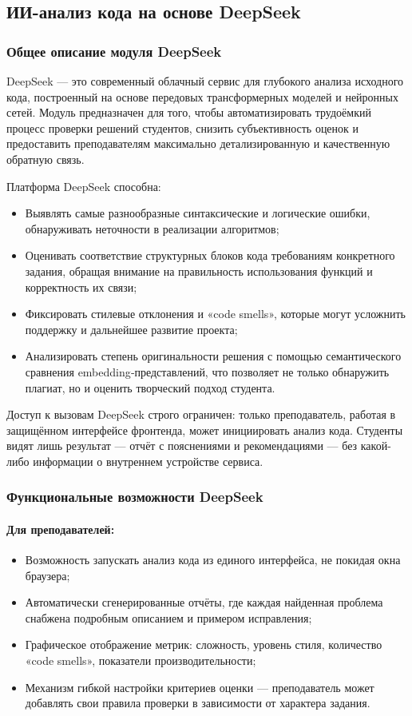 \subsection{ИИ-анализ кода на основе DeepSeek}

\subsubsection{Общее описание модуля DeepSeek}
DeepSeek — это современный облачный сервис для глубокого анализа исходного кода, построенный на основе передовых трансформерных моделей и нейронных сетей. Модуль предназначен для того, чтобы автоматизировать трудоёмкий процесс проверки решений студентов, снизить субъективность оценок и предоставить преподавателям максимально детализированную и качественную обратную связь.

Платформа DeepSeek способна:
\begin{itemize}
  \item Выявлять самые разнообразные синтаксические и логические ошибки, обнаруживать неточности в реализации алгоритмов;
  \item Оценивать соответствие структурных блоков кода требованиям конкретного задания, обращая внимание на правильность использования функций и корректность их связи;
  \item Фиксировать стилевые отклонения и «code smells», которые могут усложнить поддержку и дальнейшее развитие проекта;
  \item Анализировать степень оригинальности решения с помощью семантического сравнения embedding‐представлений, что позволяет не только обнаружить плагиат, но и оценить творческий подход студента.
\end{itemize}

Доступ к вызовам DeepSeek строго ограничен: только преподаватель, работая в защищённом интерфейсе фронтенда, может инициировать анализ кода. Студенты видят лишь результат — отчёт с пояснениями и рекомендациями — без какой-либо информации о внутреннем устройстве сервиса.

\subsubsection{Функциональные возможности DeepSeek}

\paragraph{Для преподавателей:}
\begin{itemize}
  \item Возможность запускать анализ кода из единого интерфейса, не покидая окна браузера;
  \item Автоматически сгенерированные отчёты, где каждая найденная проблема снабжена подробным описанием и примером исправления;
  \item Графическое отображение метрик: сложность, уровень стиля, количество «code smells», показатели производительности;
  \item Механизм гибкой настройки критериев оценки — преподаватель может добавлять свои правила проверки в зависимости от характера задания.
\end{itemize}

